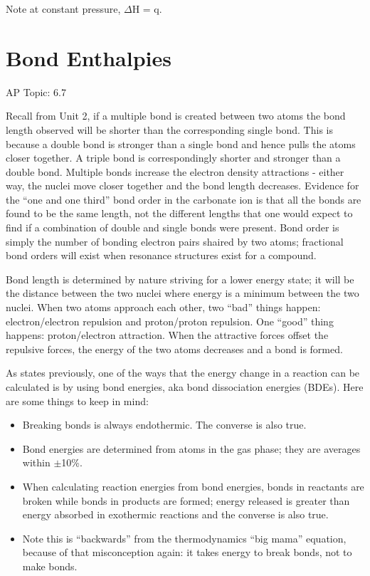 \documentclass[../chem.tex]{subfiles}
\begin{document}
Note at constant pressure, $\Delta$H = q.
\section{Bond Enthalpies}
AP Topic: 6.7

Recall from Unit 2, if a multiple bond is created between two atoms the bond length observed will be shorter than the corresponding single bond. 
This is because a double bond is stronger than a single bond and hence pulls the atoms closer together. A triple bond is correspondingly shorter and stronger than a 
double bond. Multiple bonds increase the electron density attractions - either way, the nuclei move closer together and the bond length decreases. Evidence for the 
``one and one third'' bond order in the carbonate ion is that all the bonds are found to be the same length, not the different lengths that one would expect to find if a 
combination of double and single bonds were present. Bond order is simply the number of bonding electron pairs shaired by two atoms; fractional bond orders will exist when resonance structures exist for a compound.

Bond length is determined by nature striving for a lower energy state; it will be the distance between the two nuclei where energy is a minimum between the two nuclei. 
When two atoms approach each other, two ``bad'' things happen: electron/electron repulsion and proton/proton repulsion. One ``good'' thing happens: 
proton/electron attraction. When the attractive forces offset the repulsive forces, the energy of the two atoms decreases and a bond is formed.

As states previously, one of the ways that the energy change in a reaction can be calculated is by using bond energies, aka bond dissociation energies (BDEs). Here are some things to keep in mind:
\begin{itemize}
    \item Breaking bonds is always endothermic. The converse is also true.
    \item Bond energies are determined from atoms in the gas phase; they are averages within $\pm$10\%.
    \item When calculating reaction energies from bond energies, bonds in reactants are broken while bonds in products are formed; energy released is greater than energy absorbed in exothermic reactions and the converse is also true.
    \item Note this is ``backwards'' from the thermodynamics ``big mama'' equation, because of that misconception again: it takes energy to break bonds, not to make bonds.
\end{itemize}
\end{document}
